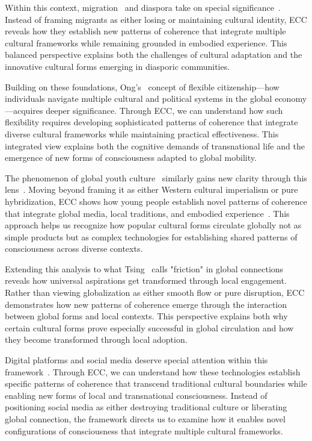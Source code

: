 Within this context, migration~ and diaspora take on special significance~\cite{schiller1992transnational, vertovec2009transnationalism}. Instead of framing migrants as either losing or maintaining cultural identity, ECC reveals how they establish new patterns of coherence that integrate multiple cultural frameworks while remaining grounded in embodied experience. This balanced perspective explains both the challenges of cultural adaptation and the innovative cultural forms emerging in diasporic communities.

Building on these foundations, Ong's~\cite{ong1999flexible, ong2006neoliberalism} concept of flexible citizenship---how individuals navigate multiple cultural and political systems in the global economy---acquires deeper significance. Through ECC, we can understand how such flexibility requires developing sophisticated patterns of coherence that integrate diverse cultural frameworks while maintaining practical effectiveness. This integrated view explains both the cognitive demands of transnational life and the emergence of new forms of consciousness adapted to global mobility.

The phenomenon of global youth culture~ similarly gains new clarity through this lens~\cite{iwabuchi2002recentering}. Moving beyond framing it as either Western cultural imperialism or pure hybridization, ECC shows how young people establish novel patterns of coherence that integrate global media, local traditions, and embodied experience~\cite{werbner2008anthropology}. This approach helps us recognize how popular cultural forms circulate globally not as simple products but as complex technologies for establishing shared patterns of consciousness across diverse contexts.

Extending this analysis to what Tsing~\cite{tsing2005friction, tsing2015mushroom} calls "friction" in global connections reveals how universal aspirations get transformed through local engagement. Rather than viewing globalization as either smooth flow or pure disruption, ECC demonstrates how new patterns of coherence emerge through the interaction between global forms and local contexts. This perspective explains both why certain cultural forms prove especially successful in global circulation and how they become transformed through local adoption.

Digital platforms and social media deserve special attention within this framework~\cite{castells2010rise, boyer2015digital}. Through ECC, we can understand how these technologies establish specific patterns of coherence that transcend traditional cultural boundaries while enabling new forms of local and transnational consciousness. Instead of positioning social media as either destroying traditional culture or liberating global connection, the framework directs us to examine how it enables novel configurations of consciousness that integrate multiple cultural frameworks.


